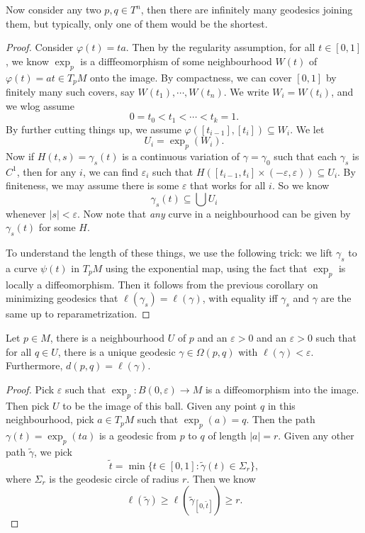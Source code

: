 \documentclass[a4paper]{article}
\begin{document}
Now consider any two $p, q \in T^n$, then there are infinitely many geodesics joining them, but typically, only one of them would be the shortest.

\begin{proof}
  Consider $\varphi(t) = ta$. Then by the regularity assumption, for all $t \in [0, 1]$, we know $\exp_p$ is a difffeomorphism of some neighbourhood $W(t)$ of $\varphi(t) = at \in T_p M$ onto the image. By compactness, we can cover $[0, 1]$ by finitely many such covers, say $W(t_1), \cdots, W(t_n)$. We write $W_i = W(t_i)$, and we wlog assume
  \[
    0 = t_0 < t_1 < \cdots < t_k = 1.
  \]
  By further cutting things up, we assume $\varphi([t_{i - 1}], [t_i]) \subseteq W_i$. We let
  \[
    U_i = \exp_p (W_i).
  \]
  Now if $H(t, s) = \gamma_s(t)$ is a continuous variation of $\gamma = \gamma_0$ such that each $\gamma_s$ is $C^1$, then for any $i$, we can find $\varepsilon_i$ such that $H([t_{i - 1}, t_i] \times (-\varepsilon, \varepsilon)) \subseteq U_i$. By finiteness, we may assume there is some $\varepsilon$ that works for all $i$. So we know
  \[
    \gamma_s(t) \subseteq \bigcup U_i
  \]
  whenever $|s| < \varepsilon$. Now note that \emph{any} curve in a neighbourhood can be given by $\gamma_s(t)$ for some $H$.

  To understand the length of these things, we use the following trick: we lift $\gamma_s$ to a curve $\psi(t)$ in $T_p M$ using the exponential map, using the fact that $\exp_p$ is locally a diffeomorphism. Then it follows from the previous corollary on minimizing geodesics that $\ell(\gamma_s) = \ell(\gamma)$, with equality iff $\gamma_s$ and $\gamma$ are the same up to reparametrization.
\end{proof}

\begin{thm}
  Let $p \in M$, there is a neighbourhood $U$ of $p$ and an $\varepsilon > 0$ and an $\varepsilon > 0$ such that for all $q \in U$, there is a unique geodesic $\gamma \in \Omega(p, q)$ with $\ell(\gamma) < \varepsilon$. Furthermore, $d(p, q) = \ell(\gamma)$.
\end{thm}

\begin{proof}
  Pick $\varepsilon$ such that $\exp_p: B(0, \varepsilon) \to M$ is a diffeomorphism into the image. Then pick $U$ to be the image of this ball. Given any point $q$ in this neighbourhood, pick $a \in T_p M$ such that $\exp_p(a) = q$. Then the path $\gamma(t) = \exp_p(ta)$ is a geodesic from $p$ to $q$ of length $|a| = r$. Given any other path $\tilde{\gamma}$, we pick
  \[
    \tilde{t} = \min\{t \in [0, 1] : \tilde{\gamma}(t) \in \Sigma_r\},
  \]
  where $\Sigma_r$ is the geodesic circle of radius $r$. Then we know
  \[
    \ell(\tilde{\gamma}) \geq \ell(\tilde{\gamma}_{[0, \tilde{t}]}) \geq r.
  \]
\end{proof}
\end{document}
